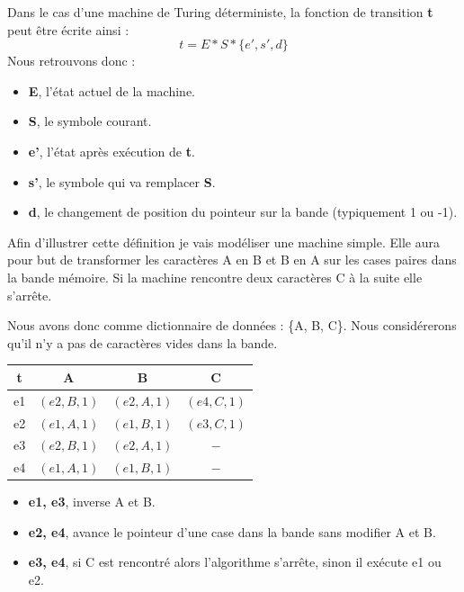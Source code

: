 \documentclass[12pt, twoside, openright]{report}
\begin{document}
Dans le cas d'une machine de Turing déterministe, la fonction de transition \textbf{t} peut être écrite ainsi : 
\[t = E * S * \{e', s', d\}\]
Nous retrouvons donc :
\begin{itemize}
    \item \textbf{E}, l'état actuel de la machine.
    \item \textbf{S}, le symbole courant.
    \item \textbf{e'}, l'état après exécution de \textbf{t}.
    \item \textbf{s'}, le symbole qui va remplacer \textbf{S}.
    \item \textbf{d}, le changement de position du pointeur sur la bande (typiquement 1 ou -1).
\end{itemize}

Afin d'illustrer cette définition je vais modéliser une machine simple. Elle aura pour but de transformer les caractères A en B et B en A sur les cases paires dans la bande mémoire. Si la machine rencontre deux caractères C à la suite elle s'arrête.

Nous avons donc comme dictionnaire de données : \{A, B, C\}. Nous considérerons qu'il n'y a pas de caractères vides dans la bande.

\begin{center}
    \begin{tabular}{|c|c|c|c|}
        \hline 
t        &A  & B & C \\ 
        \hline 
e1        &$(e2, B, 1)$   & $(e2, A, 1)$  & $(e4, C, 1)$  \\ 
        \hline 
e2        & $(e1, A, 1)$  & $(e1, B, 1)$  & $(e3, C, 1)$  \\ 
        \hline 
e3        &$(e2, B, 1)$  & $(e2, A, 1)$  & $-$ \\ 
        \hline 
e4        &$(e1, A, 1)$   & $(e1, B, 1)$  &  $-$\\ 
        \hline 
    \end{tabular}
\end{center}
\vspace{0.4cm}
\begin{itemize}
    \item \textbf{e1, e3}, inverse A et B.
    \item \textbf{e2, e4}, avance le pointeur d'une case dans la bande sans modifier A et B. 
    \item \textbf{e3, e4}, si C est rencontré alors l'algorithme s'arrête, sinon il exécute e1 ou e2.
\end{itemize}
\end{document}
